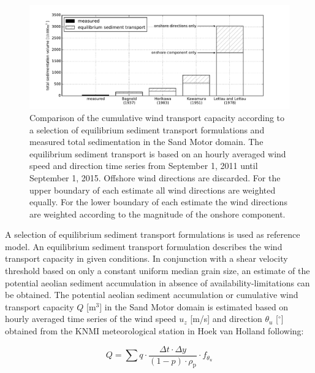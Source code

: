 \begin{figure}
  \centering
  \includegraphics[width=\columnwidth]{../Figures/transport_models}
  \caption{Comparison of the cumulative wind transport capacity
    according to a selection of equilibrium sediment transport
    formulations and measured total sedimentation in the Sand Motor
    domain. The equilibrium sediment transport is based on an hourly
    averaged wind speed and direction time series from September 1,
    2011 until September 1, 2015. Offshore wind directions are
    discarded. For the upper boundary of each estimate all wind
    directions are weighted equally. For the lower boundary of each
    estimate the wind directions are weighted according to the
    magnitude of the onshore component.}
  \label{fig:models}
\end{figure}

A selection of equilibrium sediment transport formulations is used as
reference model. An equilibrium sediment transport formulation
describes the wind transport capacity in given conditions. In
conjunction with a shear velocity threshold based on only a constant
uniform median grain size, an estimate of the potential aeolian
sediment accumulation in absence of availability-limitations can be
obtained. The potential aeolian sediment accumulation or cumulative
wind transport capacity $Q$ [$\mathrm{m^3}$] in the Sand Motor domain
is estimated based on hourly averaged time series of the wind speed
$u_z$ [m/s] and direction $\theta_u$ [$^{\circ}$] obtained from the
KNMI meteorological station in Hoek van Holland following:

\begin{equation}
  \label{eq:transport_capacity}
  Q = \sum q \cdot \frac{\Delta t \cdot \Delta y}{(1 - p) \cdot \rho_{\mathrm{p}}} \cdot f_{\theta_u}
\end{equation}

